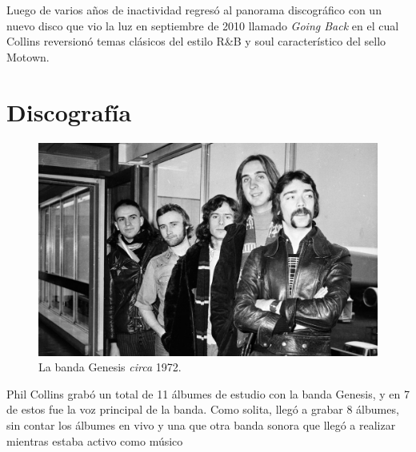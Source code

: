 \documentclass[11pt, oneside]{book}
\begin{document}
  Luego de varios años de inactividad regresó al panorama discográfico con un nuevo disco que vio la luz en septiembre de 2010 llamado \emph{Going Back} en el cual Collins reversionó temas clásicos del estilo R\&B y soul característico del sello Motown.\\

  \chapter{Discografía}
  \begin{figure}
    \begin{center}
      \includegraphics[scale = 0.4]{img/03.jpg}
    \end{center}
    \caption*{La banda Genesis \emph{circa} 1972.}
  \end{figure}

  Phil Collins grabó un total de 11 álbumes de estudio con la banda Genesis, y en 7 de estos fue la voz principal de la banda. Como solita, llegó a grabar 8 álbumes, sin contar los álbumes en vivo y una que otra banda sonora que llegó a realizar mientras estaba activo como músico
\end{document}
